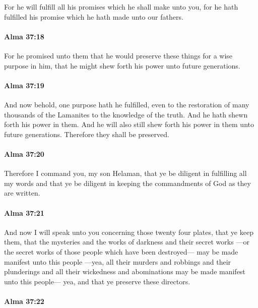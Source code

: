 			For he will fulfill all his promises which he shall make unto you,
			for he hath fulfilled his promise which he hath made unto our fathers.

		\paragraph{Alma 37:18} %
			\label{ALMA-37-18}

			For he promised unto them
			that he would preserve these things for a wise purpose in him,
			that he might shew forth his power unto future generations.

		\paragraph{Alma 37:19} %
			\label{ALMA-37-19}

			And now behold, one purpose hath he fulfilled,
			even to the restoration of many thousands of the Lamanites
			to the knowledge of the truth.
			And he hath shewn forth his power in them.
			And he will also still shew forth his power in them unto future generations.
			Therefore they shall be preserved.

		\paragraph{Alma 37:20} %
			\label{ALMA-37-20}

			Therefore I command you, my son Helaman,
			that ye be diligent in fulfilling all my words
			and that ye be diligent in keeping the commandments of God
			as they are written.

		\paragraph{Alma 37:21} %
			\label{ALMA-37-21}

			And now I will speak unto you concerning those twenty four plates,
			that ye keep them,
			that the mysteries and the works of darkness and their secret works
			---or the secret works of those people which have been destroyed---
			may be made manifest unto this people
			---yea, all their murders and robbings and their plunderings
			and all their wickedness and abominations may be made manifest unto this people---
			yea, and that ye preserve these directors.

		\paragraph{Alma 37:22} %
			\label{ALMA-37-22}

